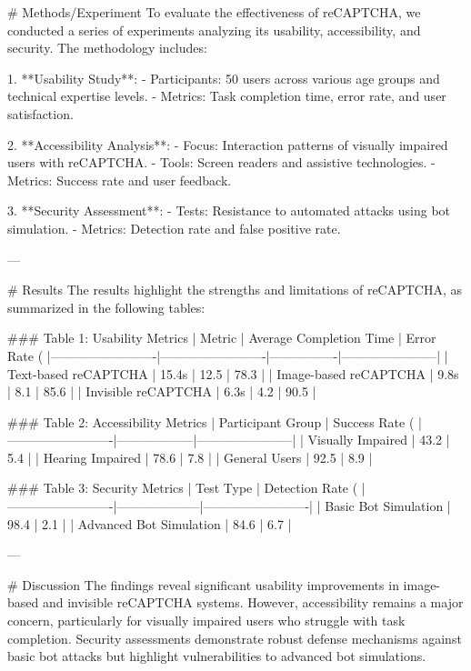 # Methods/Experiment
To evaluate the effectiveness of reCAPTCHA, we conducted a series of experiments analyzing its usability, accessibility, and security. The methodology includes:

1. **Usability Study**:
   - Participants: 50 users across various age groups and technical expertise levels.
   - Metrics: Task completion time, error rate, and user satisfaction.

2. **Accessibility Analysis**:
   - Focus: Interaction patterns of visually impaired users with reCAPTCHA.
   - Tools: Screen readers and assistive technologies.
   - Metrics: Success rate and user feedback.

3. **Security Assessment**:
   - Tests: Resistance to automated attacks using bot simulation.
   - Metrics: Detection rate and false positive rate.

---

# Results
The results highlight the strengths and limitations of reCAPTCHA, as summarized in the following tables:

### Table 1: Usability Metrics
| Metric                  | Average Completion Time | Error Rate (%
|-------------------------|-------------------------|----------------|-----------------------|
| Text-based reCAPTCHA    | 15.4s                  | 12.5           | 78.3                 |
| Image-based reCAPTCHA   | 9.8s                   | 8.1            | 85.6                 |
| Invisible reCAPTCHA     | 6.3s                   | 4.2            | 90.5                 |

### Table 2: Accessibility Metrics
| Participant Group       | Success Rate (%
|-------------------------|------------------|-----------------------|
| Visually Impaired       | 43.2             | 5.4                   |
| Hearing Impaired        | 78.6             | 7.8                   |
| General Users           | 92.5             | 8.9                   |

### Table 3: Security Metrics
| Test Type               | Detection Rate (%
|-------------------------|--------------------|-------------------------|
| Basic Bot Simulation    | 98.4               | 2.1                     |
| Advanced Bot Simulation | 84.6               | 6.7                     |

---

# Discussion
The findings reveal significant usability improvements in image-based and invisible reCAPTCHA systems. However, accessibility remains a major concern, particularly for visually impaired users who struggle with task completion. Security assessments demonstrate robust defense mechanisms against basic bot attacks but highlight vulnerabilities to advanced bot simulations.

